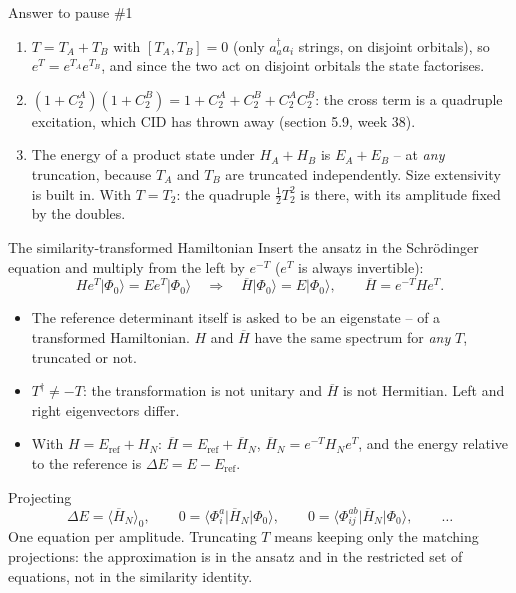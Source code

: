 \documentclass[aspectratio=169,10pt]{beamer}
\newcounter{thinkctr}
\newcommand{\thinka}[1]{%
  \vfill
  \begin{tcolorbox}[enhanced,colback=paleteal,colframe=teal,boxrule=1.2pt,arc=4pt,
    grow to left by=6mm,grow to right by=6mm,
    left=16pt,right=16pt,top=16pt,bottom=18pt,
    fonttitle=\bfseries\Large,fontupper=\large,
    title={Answer to pause \#\thethinkctr}]
  #1
  \end{tcolorbox}
  \vfill}
\newcommand{\ket}[1]{\vert #1\rangle}
\newcommand{\mel}[3]{\langle #1\lvert #2\rvert #3\rangle}
\newcommand{\av}[1]{\langle #1\rangle_0}
\newcommand{\cre}[1]{a_{#1}^{\dagger}}
\newcommand{\ann}[1]{a_{#1}}
\newcommand{\Eref}{E_{\mathrm{ref}}}
\newcommand{\ph}{\Phi_0}
\newcommand{\Hbar}{\overline{H}}
\begin{document}
\begin{frame}{Answer to pause \#1}
\thinka{%
\begin{enumerate}
\item $T=T_A+T_B$ with $[T_A,T_B]=0$ (only $\cre{a}\ann{i}$ strings, on disjoint orbitals), so $e^{T}=e^{T_A}e^{T_B}$, and since the two act on disjoint orbitals the state factorises.
\item $(1+C_2^A)(1+C_2^B)=1+C_2^A+C_2^B+C_2^AC_2^B$: the cross term is a quadruple excitation, which CID has thrown away (section 5.9, week 38).
\item The energy of a product state under $H_A+H_B$ is $E_A+E_B$ -- at \emph{any} truncation, because $T_A$ and $T_B$ are truncated independently. Size extensivity is built in. With $T=T_2$: the quadruple $\tfrac12T_2^2$ is there, with its amplitude fixed by the doubles.
\end{enumerate}}
\end{frame}

\begin{frame}[shrink=7]{The similarity-transformed Hamiltonian}
Insert the ansatz in the Schr\"odinger equation and multiply from the left by $e^{-T}$ ($e^{T}$ is always invertible):
\[
 H e^{T}\ket{\ph}=Ee^{T}\ket{\ph}
 \quad\Longrightarrow\quad
 \boxed{\Hbar\ket{\ph}=E\ket{\ph},\qquad \Hbar=e^{-T}He^{T}.}
\]
\begin{itemize}
\item The reference determinant itself is asked to be an eigenstate -- of a transformed Hamiltonian. $H$ and $\Hbar$ have the same spectrum for \emph{any} $T$, truncated or not.
\item $T^\dagger\ne-T$: the transformation is not unitary and $\Hbar$ is not Hermitian. Left and right eigenvectors differ.
\item With $H=\Eref+H_N$: $\Hbar=\Eref+\Hbar_N$, $\Hbar_N=e^{-T}H_Ne^{T}$, and the energy relative to the reference is $\Delta E=E-\Eref$.
\end{itemize}
\begin{block}{Projecting}
\[
 \Delta E=\av{\Hbar_N},\qquad
 0=\mel{\Phi_i^a}{\Hbar_N}{\ph},\qquad
 0=\mel{\Phi_{ij}^{ab}}{\Hbar_N}{\ph},\qquad\dots
\]
One equation per amplitude. Truncating $T$ means keeping only the matching projections: the approximation is in the ansatz and in the restricted set of equations, not in the similarity identity.
\end{block}
\end{frame}
\end{document}
